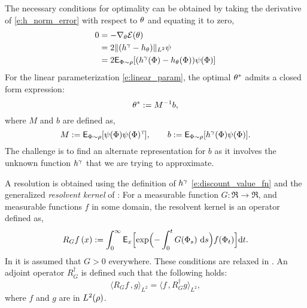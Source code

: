 The necessary conditions for optimality can be obtained by taking the derivative of \eqref{e:h_norm_error} with respect to $\theta$ and equating it to zero, 
\begin{equation}
\begin{aligned}
0 &= - \nabla_\theta \mathcal{E}(\theta)\\
& = 2 \|(h^\gamma - h_\theta) \|_{L^2} \psi \\
& = 2 {\sf E}_{\Phi \sim \rho} [(h^\gamma(\Phi) - h_\theta(\Phi)) \psi(\Phi)]
\end{aligned}
\end{equation} 
For the linear parameterization \eqref{e:linear_param}, the optimal $\theta^*$ admits a closed form expression:
\begin{equation}
\param^* := M^{-1} b,
\label{e:param_opt_lstd}
\end{equation}
where $M$ and $b$ are defined as,
\begin{equation}
M: = \Expect_{\markovstate \sim \pr} [\basis(\markovstate) \basis(\markovstate)^\transpose], \qquad b:= \Expect_{\markovstate \sim \pr} [h^\discount(\markovstate) \basis(\markovstate)].
\label{e:lstd_M_b}
\end{equation}
The challenge is to find an alternate representation for $b$ as it involves the unknown function $h^\gamma$ that we are trying to approximate.  

A resolution is obtained using the definition of $h^\gamma$ \eqref{e:discount_value_fn} and the generalized \textit{resolvent kernel} of \cite{nev72,meytwe93e,devkonmey17a}: For a measurable function $G\colon\Re\to\Re$, and measurable functions $f$ in some domain, the resolvent kernel is an operator defined as,
\begin{equation}
R_G f\, (x) := \int_0^\infty \Expect_x\Bigl[ \exp\Bigl(-\int_0^t G(\markovstate_s)\, \rmd s \Bigr) f(\markovstate_t)\Bigr] \ud t.
\label{e:resolvent_neveu}
\end{equation}
In  \cite{nev72,meytwe93e} it is assumed that $G>0$ everywhere. These conditions are relaxed in \cite{konmey03a,devkonmey17a}. An adjoint operator $R^\dagger_G$ is defined such that the following holds:
\begin{equation}
\langle R_G f \, , g \rangle_{L^2} = \langle f \, , R^\dagger_G g \rangle_{L^2}, 
\label{e:RG_adjoint}
\end{equation}
where $f$ and $g$ are in $L^2(\rho)$. 

